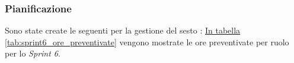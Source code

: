 \subsubsection{Pianificazione}
\label{sec:sprint6_pianificazione}
Sono state create le seguenti  per la gestione del sesto : 
\hyperref[tab:sprint6_ore_preventivate]{In tabella \ref{tab:sprint6_ore_preventivate}} vengono mostrate le ore preventivate per ruolo per lo \textit{Sprint 6}.

\begin{table}[H]
    \centering
    \caption{Ore preventivate per ruolo Sprint 6}
    \label{tab:sprint6_ore_preventivate}
\end{table}